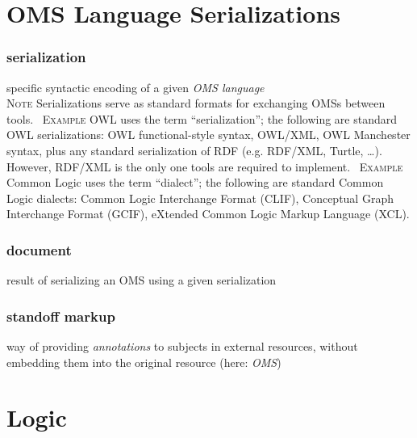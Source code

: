 \documentclass[10pt,%
\ifpretendfinal
final%
\else
draft%
\fi,
]{scrreprt}
\makeatletter
\newcommand*{\eg}{e.g.\@\xspace}
\newcommand*{\termref}[1]{\textit{#1}}
\newcommand{\sclause}[1]{\section{#1}}
\newcommand{\termdefinition}[2]{\subsubsection*{\normalsize #1}#2}
\newenvironment{definitions}[0]{\medskip }{}
\newenvironment{note}[0]{\ \\ \textsc{Note} \quad}{}
\newenvironment{example}[0]{\ \newline \textsc{Example}\quad }{}
\makeatother
\begin{document}
\sclause{OMS Language Serializations}

\begin{definitions}
  \termdefinition{serialization}{specific syntactic encoding of a given \termref{OMS language}}
  \begin{note}
    Serializations serve as standard formats for exchanging OMSs between tools.
  \end{note}
  \begin{example}
    OWL uses the term ``serialization''; the following are standard OWL serializations: OWL functional-style syntax, OWL/XML, OWL Manchester syntax, plus any standard serialization of RDF (\eg RDF/XML, Turtle, \dots).  However, RDF/XML is the only one tools are required to implement.
  \end{example}
  \begin{example}
    Common Logic uses the term ``dialect''; the following are standard Common Logic dialects: Common Logic Interchange Format (CLIF), Conceptual Graph Interchange Format (GCIF), eXtended Common Logic Markup Language (XCL).
  \end{example}


   \termdefinition{document}{result of serializing an OMS using a given serialization}


  \termdefinition{standoff markup}{way of providing \termref{annotations} to subjects in external resources, without embedding them into the original resource (here: \termref{OMS})}
\end{definitions}

\sclause{Logic}
\end{document}
